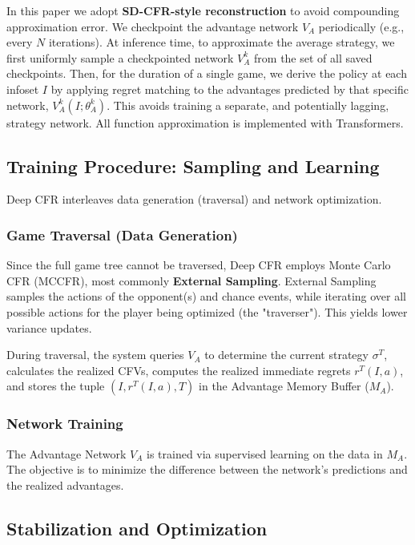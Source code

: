 \documentclass[11pt,a4paper]{article}
\begin{document}
In this paper we adopt \textbf{SD-CFR-style reconstruction} to avoid compounding approximation error. We checkpoint the advantage network $V_A$ periodically (e.g., every $N$ iterations). At inference time, to approximate the average strategy, we first uniformly sample a checkpointed network $V_A^k$ from the set of all saved checkpoints. Then, for the duration of a single game, we derive the policy at each infoset $I$ by applying regret matching to the advantages predicted by that specific network, $V_A^k(I; \theta_A^k)$. This avoids training a separate, and potentially lagging, strategy network. All function approximation is implemented with Transformers.

\subsection{Training Procedure: Sampling and Learning}

Deep CFR interleaves data generation (traversal) and network optimization.

\subsubsection{Game Traversal (Data Generation)}

Since the full game tree cannot be traversed, Deep CFR employs Monte Carlo CFR (MCCFR), most commonly \textbf{External Sampling}. External Sampling samples the actions of the opponent(s) and chance events, while iterating over all possible actions for the player being optimized (the "traverser"). This yields lower variance updates.

During traversal, the system queries $V_A$ to determine the current strategy $\sigma^T$, calculates the realized CFVs, computes the realized immediate regrets $r^T(I, a)$, and stores the tuple $(I, r^T(I, a), T)$ in the Advantage Memory Buffer ($M_A$).

\subsubsection{Network Training}

The Advantage Network $V_A$ is trained via supervised learning on the data in $M_A$. The objective is to minimize the difference between the network's predictions and the realized advantages.

\subsection{Stabilization and Optimization}
\end{document}
